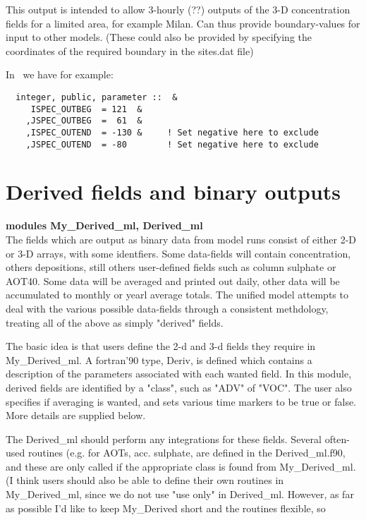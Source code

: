 This output is intended to allow 3-hourly (??) outputs of the 3-D concentration
fields for a limited area, for example Milan. Can thus provide boundary-values
for input to other models. (These could also be provided by specifying the
coordinates of the required boundary in the sites.dat file)

In \MyOutputs\ we have for example:

\begin{small}\begin{verbatim}
  integer, public, parameter ::  &
	 ISPEC_OUTBEG  = 121  &
	,JSPEC_OUTBEG  =  61  &
	,ISPEC_OUTEND  = -130 &     ! Set negative here to exclude
	,JSPEC_OUTEND  = -80        ! Set negative here to exclude
\end{verbatim}
\end{small}


\section{Derived fields and binary outputs}

{\bf modules My\_Derived\_ml, Derived\_ml}\\

\noindent
The fields which are output as binary data from model runs consist
of either 2-D or 3-D  arrays, with some identfiers. 
Some data-fields will contain concentration, others depositions, still
others user-defined fields such as column sulphate or AOT40.
Some data will be averaged and printed out daily, other data will
be accumulated to monthly or yearl average totals.
The unified model 
attempts to deal with the various possible data-fields through
a consistent methdology, treating all of the above as simply "derived"
fields.

The basic idea is that users define the 2-d and 3-d fields they require
in My\_Derived\_ml. A fortran'90 type, Deriv, is defined which contains
a description of the parameters associated with each wanted field.
In this module, derived fields are identified by a "class", such as "ADV" of "VOC".
The user also specifies if averaging is wanted, and sets various
time markers to be true or false. More details are supplied below.

 The Derived\_ml should perform any integrations for these fields.
 Several often-used routines (e.g. for AOTs, acc. sulphate, are defined 
 in the Derived\_ml.f90, and these are only called if the appropriate
 class is found from My\_Derived\_ml. (I think users should also be
 able to define their own routines in My\_Derived\_ml, since
 we do not use "use only" in Derived\_ml. However, as far as possible
 I'd like to keep My\_Derived short and the routines flexible, so 
  
